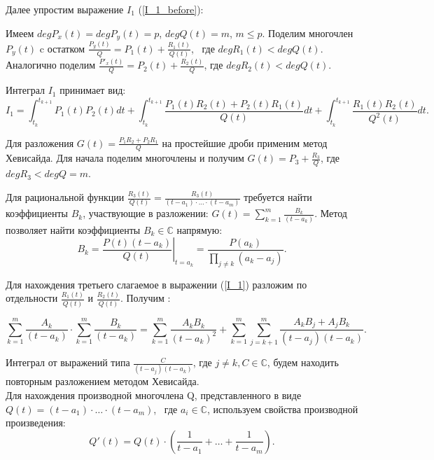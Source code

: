 \documentclass{article}
\begin{document}
Далее упростим выражение $I_1$ (\ref{I_1_before}): 

Имеем $deg P_x(t) = deg P_y(t) = p$, $ degQ(t)=m$, $ m\le p$.
Поделим многочлен $P_y(t)$ c остатком $ \frac{P_y(t)}{Q} = P_1(t) + \frac{R_1(t)}{Q(t)} $, \ где $ degR_1(t) < degQ(t)$.
Аналогично поделим $ \frac{P'_x(t)}{Q} = P_2(t) + \frac{R_2(t)}{Q}$, где $ degR_2(t) < degQ(t)$.

Интеграл $I_1$ принимает вид:
\begin{equation} \label{I_1}
	I_1 = \int_{t_{k}}^{t_{k+1}} P_1(t)P_2(t) dt + 
	 \int_{t_{k}}^{t_{k+1}} \frac{P_1(t) R_2(t) + P_2(t) R_1(t)}{Q(t)} dt + 
	 \int_{t_{k}}^{t_{k+1}} \frac{R_1(t)R_2(t)}{Q^2(t)} dt.
\end{equation}

Для разложения $G(t) = \frac{P_1 R_2 + P_2 R_1}{Q}$ на простейшие дроби применим метод Хевисайда.
Для начала поделим многочлены и получим $ G(t) = P_3 + \frac{R_3}{Q}$, где $ degR_3 < degQ = m$.

Для рациональной функции $ \frac{R_3(t)}{Q(t)} = \frac{R_3(t)}{(t-a_1) \cdot \ldots \cdot (t-a_m)}$ требуется найти коэффициенты $B_k$, участвующие в разложении: 
$ G(t) = \sum_{k=1}^{m} \frac{B_{k}}{\left(t-a_{k}\right)}$.
Метод позволяет найти коэффициенты $B_k \in  \mathbb{C}$ напрямую:
\begin{equation} \label{Heaviside}
B_{k}=\left.\frac{P(t)(t-a_k)}{Q(t)}\right|_{t=a_k} = \frac{P(a_k)}{\prod_{j \ne k}{(a_k - a_j)}}.
\end{equation}


Для нахождения третьего слагаемое в выражении (\ref{I_1}) разложим по отдельности $ \frac{R_1(t)}{Q(t)}$ 
и $\frac{R_2(t)}{Q(t)}$. Получим : 

\begin{equation} \label{two_sum}
	\sum_{k=1}^m \frac{A_{k}}{\left(t-a_{k}\right)} \cdot 
	\sum_{k=1}^m \frac{B_{k}}{\left(t-a_{k}\right)} = 
	\sum_{k=1}^m \frac{A_{k} B_{k}}{\left(t-a_{k}\right)^2} +
	\sum_{k=1}^m  \sum_{j=k+1}^m \frac{A_{k} B_{j} + A_{j} B_{k}} {\left(t-a_{j}\right)\left(t-a_{k}\right) }.
\end{equation}

Интеграл от выражений типа $ \frac{C}{(t-a_j)(t-a_k)}$, где $ j \ne k,  C \in  \mathbb{C}$, будем находить повторным разложением методом Хевисайда. \\

Для нахождения производной многочлена Q, представленного в виде
$ Q(t) = (t-a_1) \cdot \ldots \cdot (t-a_m)$, \ где $a_i \in  \mathbb{C}$,
используем свойства производной произведения:
\begin{equation}
	Q'(t)=Q(t) \cdot \left( \frac{1}{t - a_1} + \ldots + \frac{1}{t - a_m} \right).
\end{equation}
\end{document}
